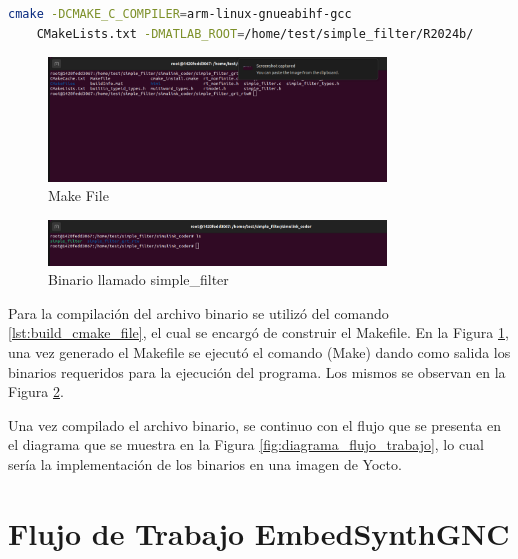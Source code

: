 \begin{lstlisting}[language=bash, caption={Compilacion del programa, Linux}, label=lst:build_cmake_file]
    cmake -DCMAKE_C_COMPILER=arm-linux-gnueabihf-gcc 
    CMakeLists.txt -DMATLAB_ROOT=/home/test/simple_filter/R2024b/
\end{lstlisting}

\begin{figure}[h!]
    \centering
    \includegraphics[width=0.8\textwidth]{fig/especifico_2/M2MT/paso_a_paso_mtmt/cmake_file.pdf}
    \caption{Make File}
    \label{fig:make_file}
\end{figure}


\begin{figure}[h!]
    \centering
    \includegraphics[width=0.8\textwidth]{fig/especifico_2/M2MT/paso_a_paso_mtmt/binario_compilado.pdf}
    \caption{Binario llamado simple\_filter}
    \label{fig:binario_compilado}
\end{figure}

Para la compilación del archivo binario se utilizó del comando \ref{lst:build_cmake_file}, el cual se encargó de construir el Makefile. En la Figura \ref{fig:make_file}, una vez generado el Makefile se ejecutó el comando (Make) dando como salida los binarios requeridos para la ejecución del programa. Los mismos se observan en la Figura \ref{fig:binario_compilado}.

Una vez compilado el archivo binario, se continuo con el flujo que se presenta en el diagrama que se muestra en la Figura \ref{fig:diagrama_flujo_trabajo}, lo cual sería la implementación de los binarios en una imagen de Yocto.
\newpage

\section{Flujo de Trabajo EmbedSynthGNC}

